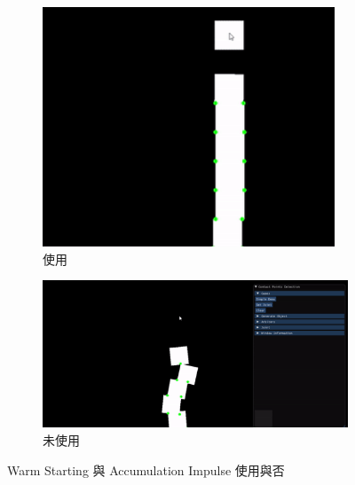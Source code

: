 \begin{figure}[h]
    \begin{subfigure}[b]{0.5\linewidth}
        \begin{center}
            \includegraphics[width=\linewidth]{./resources/physics/has.png}
        \end{center}
        \caption{使用}
    \end{subfigure}
    \begin{subfigure}[b]{0.5\linewidth}
        \begin{center}
            \includegraphics[width=\linewidth]{./resources/physics/none.png}
        \end{center}
        \caption{未使用}
    \end{subfigure}
    \caption{Warm Starting 與 Accumulation Impulse 使用與否}
    \label{WS_AI}
\end{figure}


